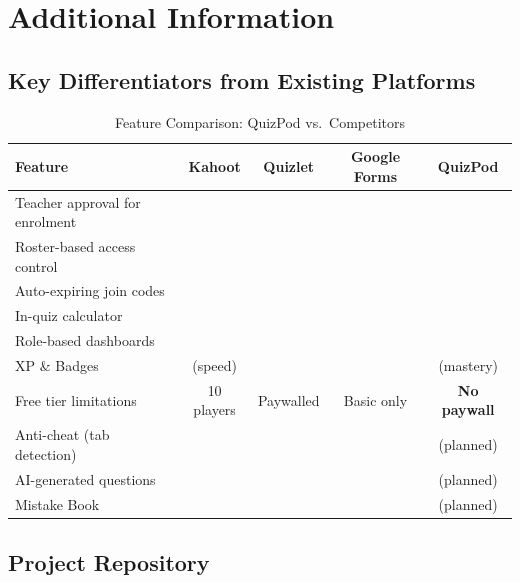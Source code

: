 \documentclass[12pt,a4paper]{article}
\newcommand{\yes}{\textcolor{accent}{\ding{51}}}   %
\newcommand{\no}{\textcolor{red}{\ding{55}}}        %
\begin{document}
\section{Additional Information}

\subsection{Key Differentiators from Existing Platforms}

\begin{table}[H]
  \centering
  \caption{Feature Comparison: QuizPod vs.\ Competitors}
  \small
  \begin{tabularx}{\linewidth}{@{} X c c c c @{}}
    \toprule
    \textbf{Feature} & \textbf{Kahoot} & \textbf{Quizlet} & \textbf{Google Forms} & \textbf{QuizPod} \\
    \midrule
    Teacher approval for enrolment  & \no & \no & \no & \yes \\
    Roster-based access control     & \no & \no & \no & \yes \\
    Auto-expiring join codes        & \no & \no & \no & \yes \\
    In-quiz calculator              & \no & \no & \no & \yes \\
    Role-based dashboards           & \no & \no & \no & \yes \\
    XP \& Badges                   & \yes (speed) & \no & \no & \yes (mastery) \\
    Free tier limitations           & 10 players & Paywalled & Basic only & \textbf{No paywall} \\
    Anti-cheat (tab detection)      & \no & \no & \no & \yes (planned) \\
    AI-generated questions          & \no & \no & \no & \yes (planned) \\
    Mistake Book                    & \no & \no & \no & \yes (planned) \\
    \bottomrule
  \end{tabularx}
\end{table}

\subsection{Project Repository}
\end{document}
